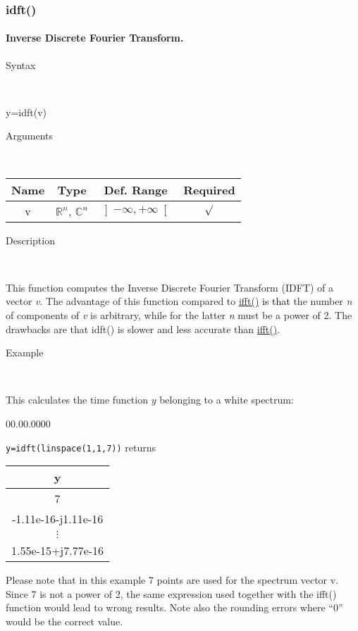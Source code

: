 \newpage
\subsubsection*{\hypertarget{idft}{}{\Large idft()}}


\paragraph{\label{par:Inverse-Discrete-Fourier}Inverse Discrete Fourier Transform.}

\begin{description}
\item [Syntax]~
\end{description}
y=idft(v)

\begin{description}
\item [Arguments]~
\end{description}
\begin{tabular}{|c|c|c|c|}
\hline 
Name&
Type&
Def. Range&
Required\tabularnewline
\hline
\hline 
v&
$\mathbb{R}^{n}$, $\mathbb{C}^{n}$&
$\left]-\infty,+\infty\right[$&
$\surd$\tabularnewline
\hline 
\end{tabular}

\begin{description}
\item [Description]~
\end{description}
This function computes the Inverse Discrete Fourier Transform (IDFT)
of a vector \textit{v}.  The advantage of this function compared to
\textcolor{blue}{\hyperlink{ifft}{ifft()}}
\textcolor{black}{is that} the number \textit{n} of components of
\textit{v} is arbitrary, while for the latter \textit{n} must be a
power of 2. The drawbacks are that idft() is slower and less accurate
than \textcolor{blue}{\hyperlink{ifft}{ifft()}}.

\begin{description}
\item [Example]~
\end{description}
This calculates the time function $y$ belonging to a white spectrum:

\begin{lyxlist}{00.00.0000}
\item [\texttt{y=idft(linspace(1,1,7))}]returns \begin{tabular}{|c|}
\hline 
y\tabularnewline
\hline
\hline 
7\tabularnewline
\hline 
-1.11e-16-j1.11e-16\tabularnewline
\hline 
$\vdots$\tabularnewline
\hline 
1.55e-15+j7.77e-16\tabularnewline
\hline
\end{tabular}
\end{lyxlist}
Please note that in this example 7 points are used for the spectrum
vector v. Since 7 is not a power of 2, the same expression used
together with the ifft() function would lead to wrong results. Note
also the rounding errors where {}``0'' would be the correct value.

